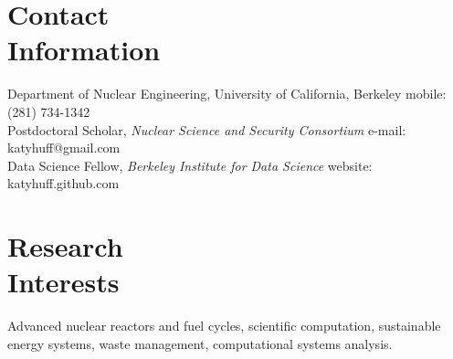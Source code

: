 \documentclass[margin,line]{resume}
\begin{document}
\begin{resume}

    \section{\mysidestyle Contact\\Information}

    Department of Nuclear Engineering, University of California, Berkeley       \hfill mobile: (281) 734-1342           \vspace{0mm}\\\vspace{0mm}%
    Postdoctoral Scholar, \textsl{Nuclear Science and Security Consortium}       \hfill e-mail: katyhuff@gmail.com            \vspace{0mm}\\\vspace{0mm}%
    Data Science Fellow, \textsl{Berkeley Institute for Data Science}           \hfill website: katyhuff.github.com     \vspace{0mm}\\\vspace{-4.5mm}%
    \vspace{-3mm}

    \section{\mysidestyle Research\\Interests}
		Advanced nuclear reactors and fuel cycles, scientific 
                computation, sustainable energy systems, waste 
                management, computational systems analysis. %
    

\end{resume}
\end{document}
